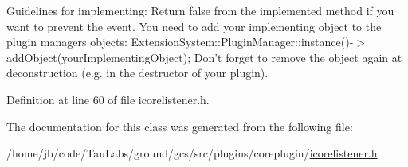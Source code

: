 \-Guidelines for implementing\-:   \-Return false from the implemented method if you want to prevent the event.  \-You need to add your implementing object to the plugin managers objects\-: \-Extension\-System\-::\-Plugin\-Manager\-::instance()-\/$>$add\-Object(your\-Implementing\-Object);  \-Don't forget to remove the object again at deconstruction (e.\-g. in the destructor of your plugin). 

\-Definition at line 60 of file icorelistener.\-h.



\-The documentation for this class was generated from the following file\-:\begin{DoxyCompactItemize}
\item 
/home/jb/code/\-Tau\-Labs/ground/gcs/src/plugins/coreplugin/\hyperlink{icorelistener_8h}{icorelistener.\-h}\end{DoxyCompactItemize}
